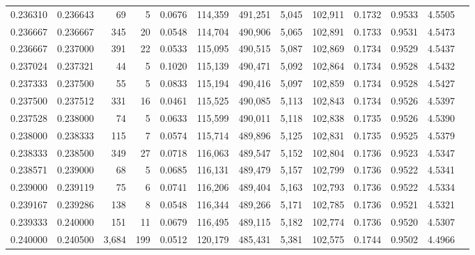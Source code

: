 \begin{tabular}{rrrrrrrrrrrrr}
0.236310 & 0.236643 &    69 &   5 &                                     0.0676 & 114,359 & 491,251 &   5,045 & 102,911 & 0.1732 & 0.9533 & 4.5505 \\
0.236667 & 0.236667 &   345 &  20 &                                     0.0548 & 114,704 & 490,906 &   5,065 & 102,891 & 0.1733 & 0.9531 & 4.5473 \\
0.236667 & 0.237000 &   391 &  22 &                                     0.0533 & 115,095 & 490,515 &   5,087 & 102,869 & 0.1734 & 0.9529 & 4.5437 \\
0.237024 & 0.237321 &    44 &   5 &                                     0.1020 & 115,139 & 490,471 &   5,092 & 102,864 & 0.1734 & 0.9528 & 4.5432 \\
0.237333 & 0.237500 &    55 &   5 &                                     0.0833 & 115,194 & 490,416 &   5,097 & 102,859 & 0.1734 & 0.9528 & 4.5427 \\
0.237500 & 0.237512 &   331 &  16 &                                     0.0461 & 115,525 & 490,085 &   5,113 & 102,843 & 0.1734 & 0.9526 & 4.5397 \\
0.237528 & 0.238000 &    74 &   5 &                                     0.0633 & 115,599 & 490,011 &   5,118 & 102,838 & 0.1735 & 0.9526 & 4.5390 \\
0.238000 & 0.238333 &   115 &   7 &                                     0.0574 & 115,714 & 489,896 &   5,125 & 102,831 & 0.1735 & 0.9525 & 4.5379 \\
0.238333 & 0.238500 &   349 &  27 &                                     0.0718 & 116,063 & 489,547 &   5,152 & 102,804 & 0.1736 & 0.9523 & 4.5347 \\
0.238571 & 0.239000 &    68 &   5 &                                     0.0685 & 116,131 & 489,479 &   5,157 & 102,799 & 0.1736 & 0.9522 & 4.5341 \\
0.239000 & 0.239119 &    75 &   6 &                                     0.0741 & 116,206 & 489,404 &   5,163 & 102,793 & 0.1736 & 0.9522 & 4.5334 \\
0.239167 & 0.239286 &   138 &   8 &                                     0.0548 & 116,344 & 489,266 &   5,171 & 102,785 & 0.1736 & 0.9521 & 4.5321 \\
0.239333 & 0.240000 &   151 &  11 &                                     0.0679 & 116,495 & 489,115 &   5,182 & 102,774 & 0.1736 & 0.9520 & 4.5307 \\
0.240000 & 0.240500 & 3,684 & 199 &                                     0.0512 & 120,179 & 485,431 &   5,381 & 102,575 & 0.1744 & 0.9502 & 4.4966 \\

\end{tabular}
